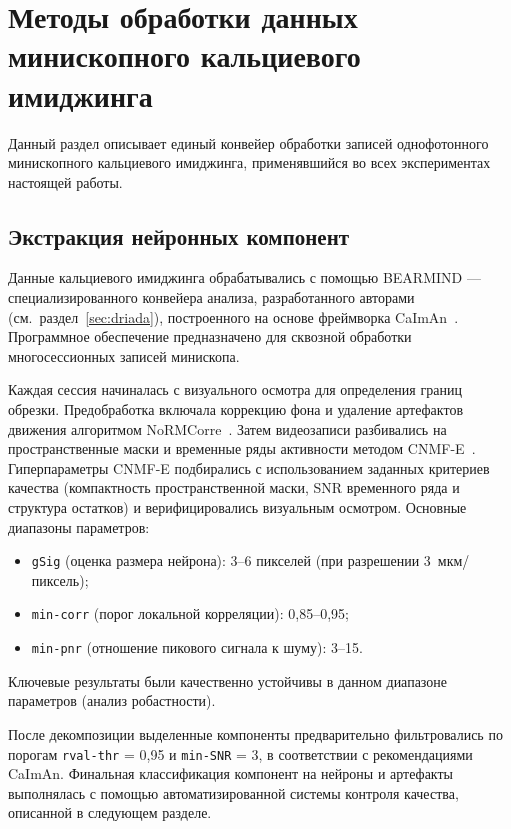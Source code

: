 
\section{Методы обработки данных минископного кальциевого имиджинга}\label{sec:calcium_methods}

Данный раздел описывает единый конвейер обработки записей однофотонного минископного кальциевого имиджинга, применявшийся во всех экспериментах настоящей работы.

\subsection{Экстракция нейронных компонент}\label{sec:cnmfe_processing}

Данные кальциевого имиджинга обрабатывались с помощью BEARMIND --- специализированного конвейера анализа, разработанного авторами (см.\ раздел~\ref{sec:driada}), построенного на основе фреймворка CaImAn~\cite{Pnevmatikakis2016}. Программное обеспечение предназначено для сквозной обработки многосессионных записей минископа.

Каждая сессия начиналась с визуального осмотра для определения границ обрезки. Предобработка включала коррекцию фона и удаление артефактов движения алгоритмом NoRMCorre~\cite{Pnevmatikakis2017}. Затем видеозаписи разбивались на пространственные маски и временные ряды активности методом CNMF-E~\cite{Zhou2018}. Гиперпараметры CNMF-E подбирались с использованием заданных критериев качества (компактность пространственной маски, SNR временного ряда и структура остатков) и верифицировались визуальным осмотром. Основные диапазоны параметров:
\begin{itemize}
    \item \texttt{gSig} (оценка размера нейрона): 3--6 пикселей (при разрешении 3~мкм/пиксель);
    \item \texttt{min-corr} (порог локальной корреляции): 0{,}85--0{,}95;
    \item \texttt{min-pnr} (отношение пикового сигнала к шуму): 3--15.
\end{itemize}

Ключевые результаты были качественно устойчивы в данном диапазоне параметров (анализ робастности).

После декомпозиции выделенные компоненты предварительно фильтровались по порогам \texttt{rval-thr} = 0{,}95 и \texttt{min-SNR} = 3, в соответствии с рекомендациями CaImAn. Финальная классификация компонент на нейроны и артефакты выполнялась с помощью автоматизированной системы контроля качества, описанной в следующем разделе.

